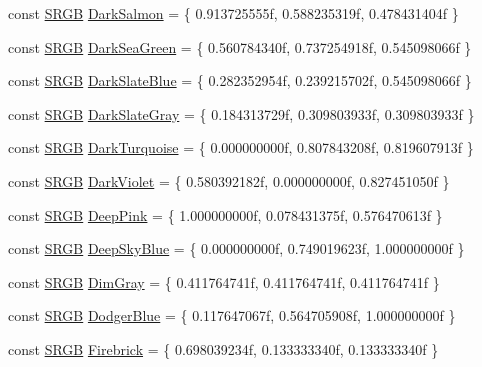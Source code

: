 \begin{DoxyCompactItemize}
\item 
const \hyperlink{structmage_1_1_s_r_g_b}{S\+R\+GB} \hyperlink{namespacemage_1_1color_a2697a4326b2aedf336ea6ffff44dafcf}{Dark\+Salmon} = \{ 0.\+913725555f, 0.\+588235319f, 0.\+478431404f \}
\item 
const \hyperlink{structmage_1_1_s_r_g_b}{S\+R\+GB} \hyperlink{namespacemage_1_1color_a76e0071e1f8b94be7e63c606e50f50ce}{Dark\+Sea\+Green} = \{ 0.\+560784340f, 0.\+737254918f, 0.\+545098066f \}
\item 
const \hyperlink{structmage_1_1_s_r_g_b}{S\+R\+GB} \hyperlink{namespacemage_1_1color_a0ae7c65a65ed59d6e9c460b6fff6f969}{Dark\+Slate\+Blue} = \{ 0.\+282352954f, 0.\+239215702f, 0.\+545098066f \}
\item 
const \hyperlink{structmage_1_1_s_r_g_b}{S\+R\+GB} \hyperlink{namespacemage_1_1color_a24d29f892ab6d1e16c503166ffcca0cc}{Dark\+Slate\+Gray} = \{ 0.\+184313729f, 0.\+309803933f, 0.\+309803933f \}
\item 
const \hyperlink{structmage_1_1_s_r_g_b}{S\+R\+GB} \hyperlink{namespacemage_1_1color_a01e6056e8a522297fe4f201043297e27}{Dark\+Turquoise} = \{ 0.\+000000000f, 0.\+807843208f, 0.\+819607913f \}
\item 
const \hyperlink{structmage_1_1_s_r_g_b}{S\+R\+GB} \hyperlink{namespacemage_1_1color_addcf49bc45daf9623ce99da3113d506c}{Dark\+Violet} = \{ 0.\+580392182f, 0.\+000000000f, 0.\+827451050f \}
\item 
const \hyperlink{structmage_1_1_s_r_g_b}{S\+R\+GB} \hyperlink{namespacemage_1_1color_a2f32949f29b73476666817a1fab57474}{Deep\+Pink} = \{ 1.\+000000000f, 0.\+078431375f, 0.\+576470613f \}
\item 
const \hyperlink{structmage_1_1_s_r_g_b}{S\+R\+GB} \hyperlink{namespacemage_1_1color_a34efa3932c85751d00d0e6643f0d2f02}{Deep\+Sky\+Blue} = \{ 0.\+000000000f, 0.\+749019623f, 1.\+000000000f \}
\item 
const \hyperlink{structmage_1_1_s_r_g_b}{S\+R\+GB} \hyperlink{namespacemage_1_1color_a5936f7ed79e098da666268db498a91a9}{Dim\+Gray} = \{ 0.\+411764741f, 0.\+411764741f, 0.\+411764741f \}
\item 
const \hyperlink{structmage_1_1_s_r_g_b}{S\+R\+GB} \hyperlink{namespacemage_1_1color_a8705f2ef78eda639953af9102ef63503}{Dodger\+Blue} = \{ 0.\+117647067f, 0.\+564705908f, 1.\+000000000f \}
\item 
const \hyperlink{structmage_1_1_s_r_g_b}{S\+R\+GB} \hyperlink{namespacemage_1_1color_a4d557745807e6fea222312724352dfcb}{Firebrick} = \{ 0.\+698039234f, 0.\+133333340f, 0.\+133333340f \}

\end{DoxyCompactItemize}
